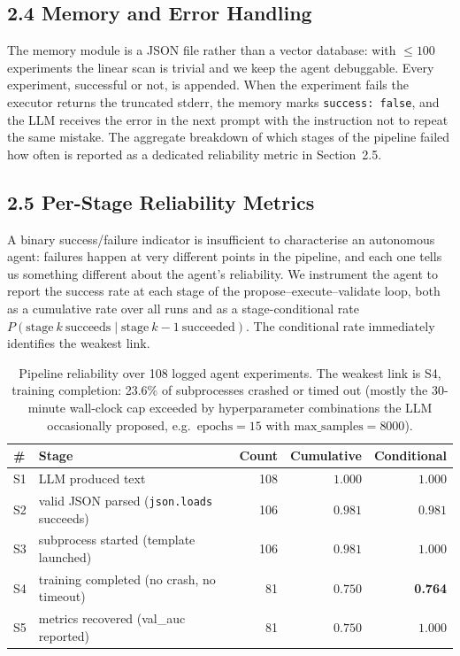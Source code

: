 \documentclass[11pt,a4paper]{article}
\begin{document}
\subsection*{2.4 Memory and Error Handling}

The memory module is a JSON file rather than a vector database: with $\le 100$ experiments the linear scan is trivial and we keep the agent debuggable. Every experiment, successful or not, is appended. When the experiment fails the executor returns the truncated stderr, the memory marks \texttt{success: false}, and the LLM receives the error in the next prompt with the instruction not to repeat the same mistake. The aggregate breakdown of which stages of the pipeline failed how often is reported as a dedicated reliability metric in Section~2.5.

\subsection*{2.5 Per-Stage Reliability Metrics}

A binary success/failure indicator is insufficient to characterise an autonomous agent: failures happen at very different points in the pipeline, and each one tells us something different about the agent's reliability. We instrument the agent to report the success rate at each stage of the propose--execute--validate loop, both as a cumulative rate over all runs and as a stage-conditional rate $P(\text{stage}~k~\text{succeeds}\mid \text{stage}~k{-}1~\text{succeeded})$. The conditional rate immediately identifies the weakest link.

\begin{table}[h]
\centering
\small
\begin{tabular}{llrrr}
\toprule
\# & Stage & Count & Cumulative & Conditional \\
\midrule
S1 & LLM produced text                                    & 108 & $1.000$ & $1.000$ \\
S2 & valid JSON parsed (\texttt{json.loads} succeeds)     & 106 & $0.981$ & $0.981$ \\
S3 & subprocess started (template launched)               & 106 & $0.981$ & $1.000$ \\
S4 & training completed (no crash, no timeout)            & 81  & $0.750$ & \textbf{0.764} \\
S5 & metrics recovered (val\_auc reported)                & 81  & $0.750$ & $1.000$ \\
\bottomrule
\end{tabular}
\caption{Pipeline reliability over 108 logged agent experiments. The weakest link is S4, training completion: 23.6\% of subprocesses crashed or timed out (mostly the 30-minute wall-clock cap exceeded by hyperparameter combinations the LLM occasionally proposed, e.g.\ $\text{epochs}=15$ with $\text{max\_samples}=8000$).}
\end{table}
\end{document}
